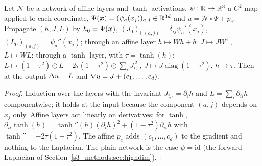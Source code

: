\begin{lemma}\label{sA_proofs:lem:lap}
Let $\mathcal N$ be a network of affine layers and $\tanh$ activations, $\psi:\mathbb{R}\to\mathbb{R}^3$ a $C^2$ map applied
to each coordinate, $\Psi(\boldsymbol{x})=(\psi_a(x_j))_{a,j}\in\mathbb{R}^{3d}$ and $u=\mathcal N\circ\Psi+p_c$. Propagate $(h,J,L)$
by $h_0=\Psi(\boldsymbol{x})$, $(J_0)_{i,(a,j)}=\delta_{ij}\psi_a'(x_j)$, $(L_0)_{(a,j)}=\psi_a''(x_j)$; through an
affine layer $h\mapsto Wh+b$: $J\mapsto JW^\top$, $L\mapsto WL$; through a $\tanh$ layer, with
$\tau=\tanh(h)$: $L\mapsto(1-\tau^2)\odot L-2\tau(1-\tau^2)\odot\sum_iJ_{i,\cdot}^{\,2}$,
$J\mapsto J\operatorname{diag}(1-\tau^2)$, $h\mapsto\tau$. Then at the output $\Delta u=L$ and
$\nabla u=J+(c_1,\dots,c_d)$.
\end{lemma}
\begin{proof}
Induction over the layers with the invariant $J_{i,\cdot}=\partial_ih$ and $L=\sum_i\partial_{ii}h$
componentwise; it holds at the input because the component $(a,j)$ depends on $x_j$ only. Affine
layers act linearly on derivatives; for $\tanh$,
$\partial_{ii}\tanh(h)=\tanh''(h)(\partial_ih)^2+(1-\tau^2)\partial_{ii}h$ with
$\tanh''=-2\tau(1-\tau^2)$. The affine $p_c$ adds $(c_1,\dots,c_d)$ to the gradient and nothing to
the Laplacian. The plain network is the case $\psi=\mathrm{id}$ (the forward Laplacian of
Section~\ref{s3_methods:sec:highdim}).
\end{proof}

